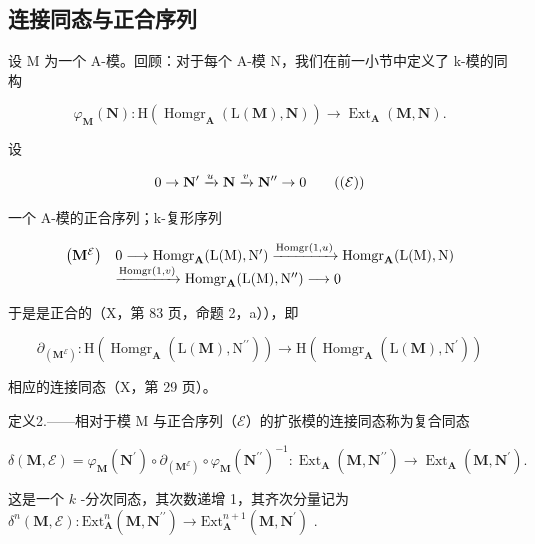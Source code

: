\subsection{连接同态与正合序列}

设 M 为一个 A-模。回顾：对于每个 A-模 N，我们在前一小节中定义了 k-模的同构

\[
\varphi_ {\mathbf {M}} (\mathbf {N}): \mathrm{H} (\operatorname{Homgr} _ {\mathbf {A}} (\mathrm{L} (\mathbf {M}), \mathbf {N})) \rightarrow \operatorname{Ext} _ {\mathbf {A}} (\mathbf {M}, \mathbf {N}).
\]

设

\[
0 \to \mathbf {N} ^ {\prime} \xrightarrow {u} \mathbf {N} \xrightarrow {v} \mathbf {N} ^ {\prime \prime} \to 0\tag{$(\mathcal{E})$}
\]

一个 A-模的正合序列；k-复形序列

\[
\begin{array}{r l} \left(\mathbf {M} ^ {\mathcal {E}}\right) & 0 \longrightarrow \operatorname{Homgr} _ {\mathbf {A}} (\mathrm{L} (\mathrm{M}), \mathrm{N} ^ {\prime}) \xrightarrow {\operatorname{Homgr} (1 , u)} \operatorname{Homgr} _ {\mathbf {A}} (\mathrm{L} (\mathrm{M}), \mathrm{N}) \\ & \xrightarrow {\operatorname{Homgr} (1 , v)} \operatorname{Homgr} _ {\mathbf {A}} (\mathrm{L} (\mathrm{M}), \mathrm{N} ^ {\prime \prime}) \longrightarrow 0 \end{array}
\]

于是是正合的（X，第 83 页，命题 2，a）），即

\[
\partial_ {(\mathbf {M} ^ {\mathcal {E}})}: \mathrm{H} (\operatorname{Homgr} _ {\mathbf {A}} (\mathrm{L} (\mathbf {M}), \mathrm{N} ^ {\prime \prime})) \rightarrow \mathrm{H} (\operatorname{Homgr} _ {\mathbf {A}} (\mathrm{L} (\mathbf {M}), \mathrm{N} ^ {\prime}))
\]

相应的连接同态（X，第 29 页）。

定义2.——相对于模 M 与正合序列（\(\mathcal{E}\)）的扩张模的连接同态称为复合同态

\[
\delta (\mathbf {M}, \mathcal {E}) = \varphi_ {\mathbf {M}} (\mathbf {N} ^ {\prime}) \circ \partial_ {(\mathbf {M} ^ {\mathcal {E}})} \circ \varphi_ {\mathbf {M}} (\mathbf {N} ^ {\prime \prime}) ^ {- 1}: \operatorname{Ext} _ {\mathbf {A}} (\mathbf {M}, \mathbf {N} ^ {\prime \prime}) \rightarrow \operatorname{Ext} _ {\mathbf {A}} (\mathbf {M}, \mathbf {N} ^ {\prime}).
\]

这是一个 \(k\) -分次同态，其次数递增 1，其齐次分量记为 \(\delta^n (\mathbf{M},\mathcal{E})\colon \mathrm{Ext}_{\mathbf{A}}^{n}(\mathbf{M},\mathbf{N}^{\prime \prime})\to \mathrm{Ext}_{\mathbf{A}}^{n + 1}(\mathbf{M},\mathbf{N}^{\prime})\) .

